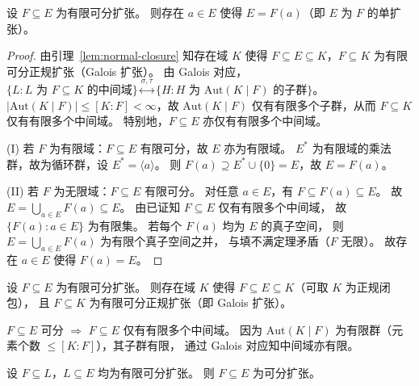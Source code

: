 \documentclass[lang=cn,a4paper,newtx]{elegantbook}
\begin{document}
\begin{theorem}[本原元定理]
  设 $F\subseteq E$ 为有限可分扩张。
  则存在 $a\in E$ 使得 $E=F(a)$（即 $E$ 为 $F$ 的单扩张）。
\end{theorem}
\begin{proof}
  由引理~\ref{lem:normal-closure} 知存在域 $K$ 使得 $F\subseteq E\subseteq K$，$F\subseteq K$ 为有限可分正规扩张（Galois 扩张）。
  由 Galois 对应，$\{L:L\text{ 为 }F\subseteq K\text{ 的中间域}\}\overset{\sigma,\tau}{\longleftrightarrow}\{H:H\text{ 为 }\mathrm{Aut}(K\mid F)\text{ 的子群}\}$。
  $|\mathrm{Aut}(K\mid F)|\le[K:F]<\infty$，故 $\mathrm{Aut}(K\mid F)$ 仅有有限多个子群，从而 $F\subseteq K$ 仅有有限多个中间域。
  特别地，$F\subseteq E$ 亦仅有有限多个中间域。

  (I) 若 $F$ 为有限域：$F\subseteq E$ 有限可分，故 $E$ 亦为有限域。
  $E^*$ 为有限域的乘法群，故为循环群，设 $E^*=\langle a\rangle$。
  则 $F(a)\supseteq E^*\cup\{0\}=E$，故 $E=F(a)$。

  (II) 若 $F$ 为无限域：$F\subseteq E$ 有限可分。
  对任意 $a\in E$，有 $F\subseteq F(a)\subseteq E$。
  故 $E=\bigcup_{a\in E}F(a)\subseteq E$。
  由已证知 $F\subseteq E$ 仅有有限多个中间域，
  故 $\{F(a):a\in E\}$ 为有限集。
  若每个 $F(a)$ 均为 $E$ 的真子空间，
  则 $E=\bigcup_{a\in E}F(a)$ 为有限个真子空间之并，
  与填不满定理矛盾（$F$ 无限）。
  故存在 $a\in E$ 使得 $F(a)=E$。
\end{proof}
\begin{lemma}\label{normal-closure}
  设 $F\subseteq E$ 为有限可分扩张。
  则存在域 $K$ 使得 $F\subseteq E\subseteq K$（可取 $K$ 为正规闭包），
  且 $F\subseteq K$ 为有限可分正规扩张（即 Galois 扩张）。
\end{lemma}

\begin{remark}
  $F\subseteq E$ 可分 $\Rightarrow$ $F\subseteq E$ 仅有有限多个中间域。
  因为 $\mathrm{Aut}(K\mid F)$ 为有限群（元素个数 $\le[K:F]$），其子群有限，
  通过 Galois 对应知中间域亦有限。
\end{remark}

\begin{lemma}\label{finite-separable-tower}
  设 $F\subseteq L$，$L\subseteq E$ 均为有限可分扩张。
  则 $F\subseteq E$ 为可分扩张。
\end{lemma}
\end{document}
